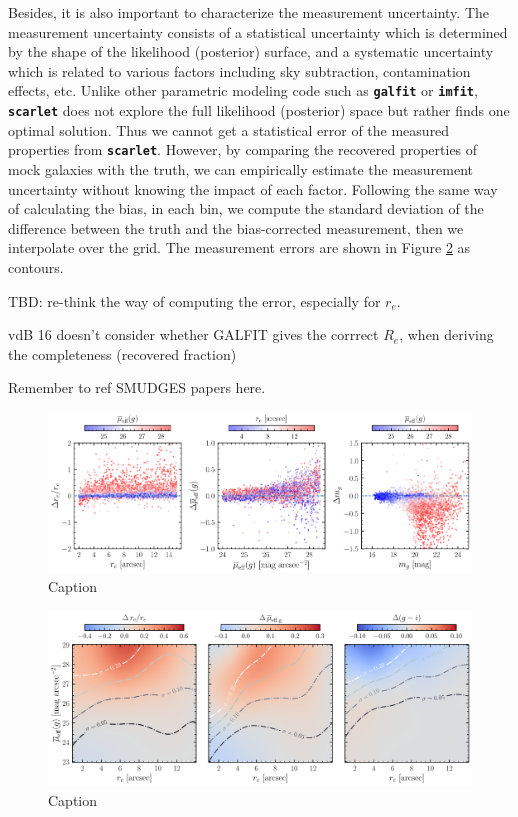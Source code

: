 \documentclass[twocolumn,astrosymb,twocolappendix]{aastex631}
\newcommand{\code}[1]{\textbf{\texttt{#1}}}
\begin{document}
\begin{CJK*}{UTF8}{gbsn}
Besides, it is also important to characterize the measurement uncertainty. The measurement uncertainty consists of a statistical uncertainty which is determined by the shape of the likelihood (posterior) surface, and a systematic uncertainty which is related to various factors including sky subtraction, contamination effects, etc. Unlike other parametric modeling code such as \code{galfit} or \code{imfit}, \code{scarlet} does not explore the full likelihood (posterior) space but rather finds one optimal solution. Thus we cannot get a statistical error of the measured properties from \code{scarlet}. However, by comparing the recovered properties of mock galaxies with the truth, we can empirically estimate the measurement uncertainty without knowing the impact of each factor. Following the same way of calculating the bias, in each bin, we compute the standard deviation of the difference between the truth and the bias-corrected measurement, then we interpolate over the grid. The measurement errors are shown in Figure \ref{fig:meas_err} as contours. 



TBD: re-think the way of computing the error, especially for $r_e$. 


vdB 16 doesn't consider whether GALFIT gives the corrrect $R_e$, when deriving the completeness (recovered fraction)

Remember to ref SMUDGES papers here.

\begin{figure}
	\vbox{ 
		\centering
		\includegraphics[width=1\linewidth]{meas_bias.pdf}
	}
    \caption{Caption}
    \label{fig:meas_bias}
\end{figure}


\begin{figure}
	\vbox{ 
		\centering
		\includegraphics[width=1\linewidth]{meas_error_spergel.pdf}
	}
    \caption{Caption}
    \label{fig:meas_err}
\end{figure}


\end{CJK*}
\end{document}
